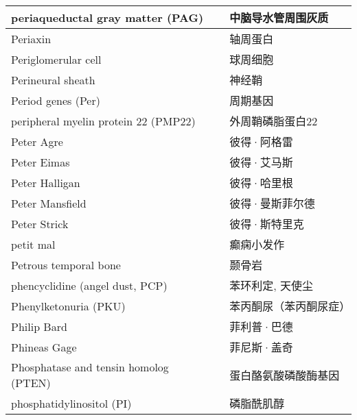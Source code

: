 \begin{longtable}{lll}
	\midrule
	periaqueductal gray matter (PAG)    && 中脑导水管周围灰质   \\
	
	\midrule
	Periaxin    && 轴周蛋白   \\
	
	\midrule
	Periglomerular cell     && 球周细胞   \\
	
	\midrule
	Perineural sheath     && 神经鞘   \\
	
	\midrule
	Period genes (Per)    && 周期基因   \\
	
	\midrule
	peripheral myelin protein 22  (PMP22)   && 外周鞘磷脂蛋白22   \\
	
	\midrule
	Peter Agre     && 彼得·阿格雷   \\
	
	\midrule
	Peter Eimas     && 彼得·艾马斯   \\
	
	\midrule
	Peter Halligan     && 彼得·哈里根   \\
	
	\midrule
	Peter Mansfield     && 彼得·曼斯菲尔德   \\
	
	\midrule
	Peter Strick     && 彼得·斯特里克   \\
	
	\midrule
	petit mal     && 癫痫小发作   \\
	
	\midrule
	Petrous temporal bone     && 颞骨岩   \\
	
	\midrule
	phencyclidine  (angel dust, PCP)  &&  苯环利定, 天使尘   \\
	
	\midrule
	Phenylketonuria (PKU)    &&  苯丙酮尿（苯丙酮尿症）   \\
	
	\midrule
	Philip Bard     && 菲利普·巴德   \\
	
	\midrule
	Phineas Gage     && 菲尼斯·盖奇   \\
	
	\midrule
	Phosphatase and tensin homolog (PTEN)    && 蛋白酪氨酸磷酸酶基因   \\
	
	\midrule
	phosphatidylinositol (PI)    && 磷脂酰肌醇   \\
	

\end{longtable}
